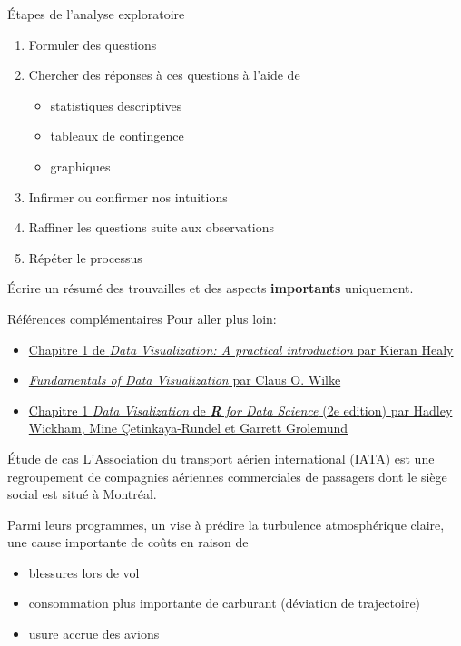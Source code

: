\documentclass[
  ignorenonframetext,
]{beamer}
\providecommand{\tightlist}{%
  \setlength{\itemsep}{0pt}\setlength{\parskip}{0pt}}
\begin{document}
\begin{frame}{Étapes de l'analyse exploratoire}
\protect{}\label{uxe9tapes-de-lanalyse-exploratoire}
\begin{enumerate}
\tightlist
\item
  Formuler des questions
\item
  Chercher des réponses à ces questions à l'aide de

  \begin{itemize}
  \tightlist
  \item
    statistiques descriptives
  \item
    tableaux de contingence
  \item
    graphiques
  \end{itemize}
\item
  Infirmer ou confirmer nos intuitions
\item
  Raffiner les questions suite aux observations
\item
  Répéter le processus
\end{enumerate}

Écrire un résumé des trouvailles et des aspects \textbf{importants}
uniquement.
\end{frame}

\begin{frame}{Références complémentaires}
\protect{}\label{ruxe9fuxe9rences-compluxe9mentaires}
Pour aller plus loin:

\begin{itemize}
\tightlist
\item
  \href{https://socviz.co/lookatdata.html\#lookatdata}{Chapitre 1 de
  \emph{Data Visualization: A practical introduction} par Kieran Healy}
\item
  \href{https://serialmentor.com/dataviz/}{\emph{Fundamentals of Data
  Visualization} par Claus O. Wilke}
\item
  \href{https://r4ds.hadley.nz/}{Chapitre 1 \emph{Data Visalization} de
  \emph{\textbf{R} for Data Science} (2e edition) par Hadley Wickham,
  Mine Çetinkaya-Rundel et Garrett Grolemund}
\end{itemize}
\end{frame}

\begin{frame}{Étude de cas}
\protect{}\label{uxe9tude-de-cas}
L'\href{https://www.iata.org/en/about/}{Association du transport aérien
international (IATA)} est une regroupement de compagnies aériennes
commerciales de passagers dont le siège social est situé à Montréal.

Parmi leurs programmes, un vise à prédire la turbulence atmosphérique
claire, une cause importante de coûts en raison de

\begin{itemize}
\tightlist
\item
  blessures lors de vol
\item
  consommation plus importante de carburant (déviation de trajectoire)
\item
  usure accrue des avions
\end{itemize}
\end{frame}
\end{document}
